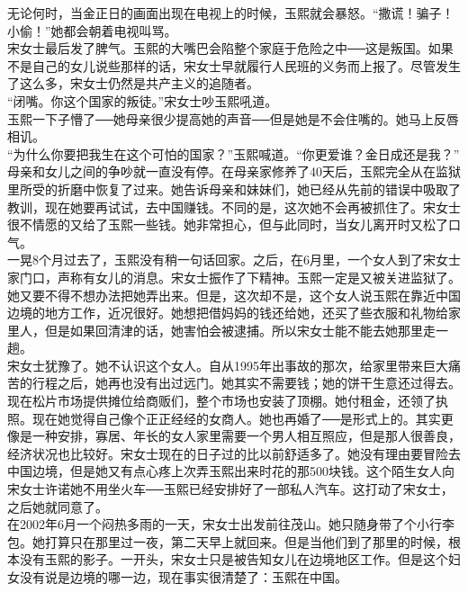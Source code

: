 无论何时，当金正日的画面出现在电视上的时候，玉熙就会暴怒。“撒谎！骗子！小偷！”她都会朝着电视叫骂。\\

宋女士最后发了脾气。玉熙的大嘴巴会陷整个家庭于危险之中──这是叛国。如果不是自己的女儿说些那样的话，宋女士早就履行人民班的义务而上报了。尽管发生了这么多，宋女士仍然是共产主义的追随者。\\

“闭嘴。你这个国家的叛徒。”宋女士吵玉熙吼道。\\

玉熙一下子懵了──她母亲很少提高她的声音──但是她是不会住嘴的。她马上反唇相讥。\\

“为什么你要把我生在这个可怕的国家？”玉熙喊道。“你更爱谁？金日成还是我？”\\

母亲和女儿之间的争吵就一直没有停。在母亲家修养了40天后，玉熙完全从在监狱里所受的折磨中恢复了过来。她告诉母亲和妹妹们，她已经从先前的错误中吸取了教训，现在她要再试试，去中国赚钱。不同的是，这次她不会再被抓住了。宋女士很不情愿的又给了玉熙一些钱。她非常担心，但与此同时，当女儿离开时又松了口气。\\

一晃8个月过去了，玉熙没有稍一句话回家。之后，在6月里，一个女人到了宋女士家门口，声称有女儿的消息。宋女士振作了下精神。玉熙一定是又被关进监狱了。她又要不得不想办法把她弄出来。但是，这次却不是，这个女人说玉熙在靠近中国边境的地方工作，近况很好。她想把借妈妈的钱还给她，还买了些衣服和礼物给家里人，但是如果回清津的话，她害怕会被逮捕。所以宋女士能不能去她那里走一趟。\\

宋女士犹豫了。她不认识这个女人。自从1995年出事故的那次，给家里带来巨大痛苦的行程之后，她再也没有出过远门。她其实不需要钱；她的饼干生意还过得去。现在松片市场提供摊位给商贩们，整个市场也安装了顶棚。她付租金，还领了执照。现在她觉得自己像个正正经经的女商人。她也再婚了──是形式上的。其实更像是一种安排，寡居、年长的女人家里需要一个男人相互照应，但是那人很善良，经济状况也比较好。宋女士现在的日子过的比以前舒适多了。她没有理由要冒险去中国边境，但是她又有点心疼上次弄玉熙出来时花的那500块钱。这个陌生女人向宋女士许诺她不用坐火车──玉熙已经安排好了一部私人汽车。这打动了宋女士，之后她就同意了。\\

在2002年6月一个闷热多雨的一天，宋女士出发前往茂山。她只随身带了个小行李包。她打算只在那里过一夜，第二天早上就回来。但是当他们到了那里的时候，根本没有玉熙的影子。一开头，宋女士只是被告知女儿在边境地区工作。但是这个妇女没有说是边境的哪一边，现在事实很清楚了：玉熙在中国。\\

